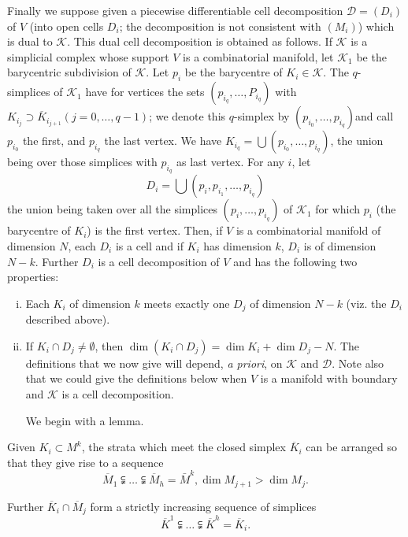 Finally we suppose given a piecewise differentiable cell decomposition
$\mathscr{D} = (D_i)$ of $V$ (into open cells $D_i$; the decomposition
is not consistent with $(M_i)$) which is dual to  $\mathscr{K}$. This
dual cell decomposition is obtained as follows. If $\mathscr{K}$ is a
simplicial complex whose support $V$ is a combinatorial manifold, let
$\mathscr{K}_1$ be the 
barycentric subdivision of $\mathscr{K}$. Let $p_i$ be the barycentre
of $K_i \in \mathscr{K}$. 
The $q$-simplices of $\mathscr{K}_1$ have for vertices the
sets $(p_{i_q},\ldots,P_{i_q})$ 
with $ K_{i_{j}} \supset \overline{K}_{i_{j+1}}(j = 0,\ldots, q-1)$;
we denote this $q$-simplex by  
$(p_{i_{0}},\ldots,p_{i_{q}})$\pageoriginale and call $p_{i_{0}}$ the first, and
$p_{i_{q}}$ the last vertex. 
We have $K_{i_{q}} = \bigcup (p_{i_{0}},\ldots,p_{i_{q}})$, the union
being over those simplices 
with $p_{i_{q}}$ as last vertex. For any $i$, let
$$
D_i = \bigcup (p_i, p_{i_{1}},\ldots,p_{i_{q}})
$$
the union being taken over all the simplices
$(p_{i},\ldots,p_{i_{q}})$ of $\mathscr{K}_{1}$ for which $p_{i}$ (the
barycentre of $K_{i}$) is the first vertex. Then, if $V$ is a
combinatorial manifold of dimension $N$, each $D_{i}$ is a cell and if
$K_{i}$ has dimension $k$, $D_{i}$ is of dimension $N-k$. Further
$D_{i}$ is a cell decomposition of $V$ and has the following two
properties: 
\begin{enumerate}[(i)]
\item Each $K_{i}$ of dimension $k$ meets exactly one $D_{j}$ of
  dimension $N-k$ (viz. the $D_{i}$ described above).

\item If $K_{i}\cap D_{j}\neq \emptyset$, then $\dim(K_{i}\cap
  D_{j})=\dim K_{i}+\dim D_{j}-N$. The definitions that we now give
  will depend, {\em a priori}, on $\mathscr{K}$ and
  $\mathscr{D}$. Note also that we could give the definitions below
  when $V$ is a manifold with boundary and $\mathscr{K}$ is a cell
  decomposition. 

We begin with a lemma.
\end{enumerate} 

\setcounter{lemma}{0}
\begin{lemma}\label{chap4-lem1} %
  Given $K_i \subset M^k$,  the strata which meet the closed simplex
  $\overline{K}_i$ can be arranged so that they give rise to a sequence
\begin{equation*}
\overline{M}_1 \subsetneqq \ldots \subsetneqq
  \overline{M}_{h}=\bar{M}^k, \dim M_{j+1} > \dim M_j.\tag{1}\label{chap4-eq1}  
\end{equation*}

  Further $\overline{K}_i \cap \overline{M}_j$ form a strictly
  increasing sequence of simplices 
\begin{equation*}
\overline{K}^1 \subsetneqq\ldots\subsetneqq \overline{K}^h =
  \overline{K}_i.\tag{2}\label{eq2}  
\end{equation*}
\end{lemma}

